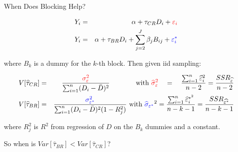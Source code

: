 \documentclass{beamer}
\numberwithin{equation}{section}
\begin{document}
\begin{frame}{When Does Blocking Help?}
\small
\begin{small}
\begin{eqnarray}
  Y_i &=& \alpha + \tau_{CR} D_i + \textcolor{red}{\varepsilon_i}  \\
  Y_i &=& \alpha + \tau_{BR} D_i + \sum_{j=2}^J \beta_j B_{ij}+ \textcolor{blue}{\varepsilon^{\ast}_i}
\end{eqnarray}
\end{small}

where $B_k$ is a dummy for the $k$-th block. Then given iid sampling:

\begin{small}
\begin{eqnarray}
V[\widehat{\tau}_{CR}]  &=& \frac{\textcolor{red}{\sigma_{\varepsilon}^2}}{\sum_{i=1}^n (D_i - \bar{D})^2}\quad \,\,\, \quad \quad \mbox{ with } \textcolor{red}{\widehat{\sigma}_{\varepsilon}^2} \quad =  \quad\frac{\sum_{i=1}^n \widehat{\varepsilon}_i^2}{n-2}=\frac{SSR_{\widehat{\varepsilon}}}{n-2}\nonumber \\
V[\widehat{\tau}_{BR}]  &=&  \frac{\textcolor{blue}{\sigma_{\varepsilon^{\ast}}^2}}{\sum_{i=1}^n (D_{i} - \bar{D})^2 (1-R_j^2)}\mbox{ with } \textcolor{blue}{\widehat{\sigma}_{\varepsilon^{\ast}}}^2 = \frac{\sum_{i=1}^n \widehat{ \varepsilon }^{\ast^2}_{i}}{n-k-1}=\frac{SSR_{\widehat{\varepsilon^{\ast}}}}{n-k-1}\nonumber
\end{eqnarray}
\end{small}

where $R_j^2$ is $R^2$ from regression of $D$ on the $B_k$ dummies and
a constant.

So when is $Var[\widehat{\tau}_{BR}]<Var[\widehat{\tau}_{CR}]$?

\end{frame}
\end{document}
